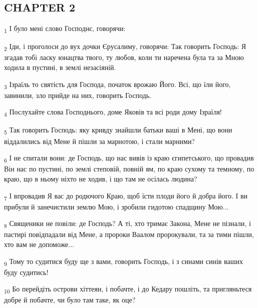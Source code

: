 \subsection{CHAPTER 2}
\begin{tcolorbox}
\textsubscript{1} І було мені слово Господнє, говорячи:
\end{tcolorbox}
\begin{tcolorbox}
\textsubscript{2} Іди, і проголоси до вух дочки Єрусалиму, говорячи: Так говорить Господь: Я згадав тобі ласку юнацтва твого, ту любов, коли ти наречена була та за Мною ходила в пустині, в землі незасіяній.
\end{tcolorbox}
\begin{tcolorbox}
\textsubscript{3} Ізраїль то святість для Господа, початок врожаю Його. Всі, що їли його, завинили, зло прийде на них, говорить Господь.
\end{tcolorbox}
\begin{tcolorbox}
\textsubscript{4} Послухайте слова Господнього, доме Яковів та всі роди дому Ізраїля!
\end{tcolorbox}
\begin{tcolorbox}
\textsubscript{5} Так говорить Господь: яку кривду знайшли батьки ваші в Мені, що вони віддалились від Мене й пішли за марнотою, і стали марними?
\end{tcolorbox}
\begin{tcolorbox}
\textsubscript{6} І не спитали вони: де Господь, що нас вивів із краю єгипетського, що провадив Він нас по пустині, по землі степовій, повній ям, по краю сухому та темному, по краю, що в ньому ніхто не ходив, і що там не осілась людина?
\end{tcolorbox}
\begin{tcolorbox}
\textsubscript{7} І впровадив Я вас до родючого Краю, щоб їсти плоди його й добра його. І ви прибули й занечистили землю Мою, і зробили гидотою спадщину Мою...
\end{tcolorbox}
\begin{tcolorbox}
\textsubscript{8} Священики не повіли: де Господь? А ті, хто тримає Закона, Мене не пізнали, і пастирі повідпадали від Мене, а пророки Ваалом пророкували, та за тими пішли, хто вам не допоможе...
\end{tcolorbox}
\begin{tcolorbox}
\textsubscript{9} Тому то судитися буду ще з вами, говорить Господь, і з синами синів ваших буду судитись!
\end{tcolorbox}
\begin{tcolorbox}
\textsubscript{10} Бо перейдіть острови хіттеян, і побачте, і до Кедару пошліть, та пригляньтеся добре й побачте, чи було там таке, як оце?
\end{tcolorbox}
